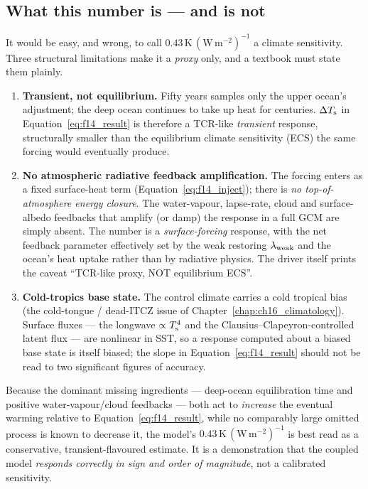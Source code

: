 \subsection{What this number is --- and is not}\label{sec:f14_honesty}

It would be easy, and wrong, to call $0.43\,\mathrm{K\,(W\,m^{-2})^{-1}}$ a
climate sensitivity. Three structural limitations make it a \emph{proxy} only,
and a textbook must state them plainly.

\begin{enumerate}[leftmargin=2em]
\item \textbf{Transient, not equilibrium.} Fifty years samples only the upper
  ocean's adjustment; the deep ocean continues to take up heat for centuries.
  $\Delta T_{\mathrm{s}}$ in Equation~\eqref{eq:f14_result} is therefore a TCR-like
  \emph{transient} response, structurally smaller than the equilibrium climate
  sensitivity (ECS) the same forcing would eventually produce.

\item \textbf{No atmospheric radiative feedback amplification.} The forcing
  enters as a fixed surface-heat term (Equation~\eqref{eq:f14_inject}); there is
  \emph{no top-of-atmosphere energy closure}. The water-vapour, lapse-rate, cloud
  and surface-albedo feedbacks that amplify (or damp) the response in a full GCM
  are simply absent. The number is a \emph{surface-forcing} response, with the
  net feedback parameter effectively set by the weak restoring
  $\lambda_{\mathrm{weak}}$ and the ocean's heat uptake rather than by radiative
  physics. The driver itself prints the caveat ``TCR-like proxy, NOT equilibrium
  ECS''.

\item \textbf{Cold-tropics base state.} The control climate carries a cold
  tropical bias (the cold-tongue / dead-ITCZ issue of
  Chapter~\ref{chap:ch16_climatology}). Surface fluxes --- the longwave
  $\propto T_{\mathrm{s}}^4$ and the Clausius--Clapeyron-controlled latent flux --- are
  nonlinear in SST, so a response computed about a biased base state is itself
  biased; the slope in Equation~\eqref{eq:f14_result} should not be read to two
  significant figures of accuracy.
\end{enumerate}

\begin{proposition}
Because the dominant missing ingredients --- deep-ocean equilibration time and
positive water-vapour/cloud feedbacks --- both act to \emph{increase} the
eventual warming relative to Equation~\eqref{eq:f14_result}, while no comparably
large omitted process is known to decrease it, the model's
$0.43\,\mathrm{K\,(W\,m^{-2})^{-1}}$ is best read as a conservative,
transient-flavoured estimate. It is a demonstration that the coupled model
\emph{responds correctly in sign and order of magnitude}, not a calibrated
sensitivity.
\end{proposition}

